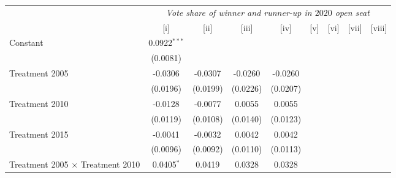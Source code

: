 
\begingroup
\centering
\begin{tabular}{lcccccccc}
   \toprule
    & \multicolumn{8}{c}{\textit{Vote share of winner and runner-up in $2020$ open seat}}\\
                                                                       & [i]            & [ii]                   & [iii]         & [iv]          & [v]           & [vi]                  & [vii]                 & [viii]\\  
   \midrule 
   Constant                                                            & 0.0922$^{***}$ &                        &               &               &               &                       &                       &   \\   
                                                                       & (0.0081)       &                        &               &               &               &                       &                       &   \\   
   Treatment 2005                                                      & -0.0306        & -0.0307                & -0.0260       & -0.0260       &               &                       &                       &   \\   
                                                                       & (0.0196)       & (0.0199)               & (0.0226)      & (0.0207)      &               &                       &                       &   \\   
   Treatment  2010                                                     & -0.0128        & -0.0077                & 0.0055        & 0.0055        &               &                       &                       &   \\   
                                                                       & (0.0119)       & (0.0108)               & (0.0140)      & (0.0123)      &               &                       &                       &   \\   
   Treatment 2015                                                      & -0.0041        & -0.0032                & 0.0042        & 0.0042        &               &                       &                       &   \\   
                                                                       & (0.0096)       & (0.0092)               & (0.0110)      & (0.0113)      &               &                       &                       &   \\   
   Treatment 2005 $\times $ Treatment  2010                            & 0.0405$^{*}$   & 0.0419                 & 0.0328        & 0.0328        &               &                       &                       &   \\   

\end{tabular}
